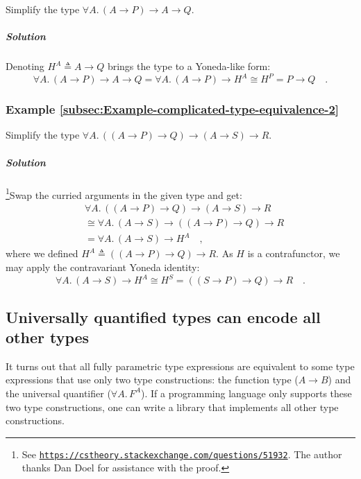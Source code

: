 Simplify the type $\forall A.\,(A\rightarrow P)\rightarrow A\rightarrow Q$.

\subparagraph{Solution}

Denoting $H^{A}\triangleq A\rightarrow Q$ brings the type to a Yoneda-like
form:
\[
\forall A.\,(A\rightarrow P)\rightarrow A\rightarrow Q=\forall A.\,(A\rightarrow P)\rightarrow H^{A}\cong H^{P}=P\rightarrow Q\quad.
\]
 

\subsubsection{Example \label{subsec:Example-complicated-type-equivalence-2}\ref{subsec:Example-complicated-type-equivalence-2}}

Simplify the type $\forall A.\,((A\rightarrow P)\rightarrow Q)\rightarrow(A\rightarrow S)\rightarrow R$.

\subparagraph{Solution}

\footnote{See \texttt{\href{https://cstheory.stackexchange.com/questions/51932}{https://cstheory.stackexchange.com/questions/51932}}.
The author thanks Dan Doel for assistance with the
proof.}Swap the curried arguments in the given type and get:
\begin{align*}
 & \forall A.\,((A\rightarrow P)\rightarrow Q)\rightarrow(A\rightarrow S)\rightarrow R\\
 & \cong\forall A.\,(A\rightarrow S)\rightarrow((A\rightarrow P)\rightarrow Q)\rightarrow R\\
 & =\forall A.\,(A\rightarrow S)\rightarrow H^{A}\quad,
\end{align*}
where we defined $H^{A}\triangleq((A\rightarrow P)\rightarrow Q)\rightarrow R$.
As $H$ is a contrafunctor, we may apply the contravariant Yoneda
identity:
\[
\forall A.\,(A\rightarrow S)\rightarrow H^{A}\cong H^{S}=((S\rightarrow P)\rightarrow Q)\rightarrow R\quad.
\]


\subsection{Universally quantified types can encode all other types}

It turns out that all fully parametric type expressions are equivalent
to some type expressions that use only two type constructions: the
function type ($A\rightarrow B$) and the universal quantifier ($\forall A.\,F^{A}$).
If a programming language only supports these two type constructions,
one can write a library that implements all other type constructions.

